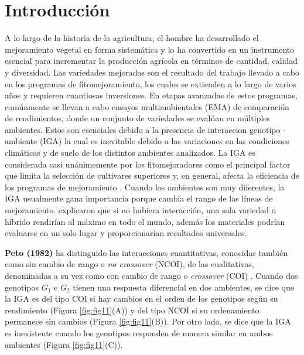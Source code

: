 

\chapter{Introducción}

A lo largo de la historia de la agricultura, el hombre ha desarrollado el mejoramiento vegetal en forma sistemática y lo ha convertido en un instrumento esencial para incrementar la producción agrícola en términos de cantidad, calidad y diversidad. Las variedades mejoradas son el resultado del trabajo llevado a cabo en los programas de fitomejoramiento, los cuales se extienden a lo largo de varios años y requieren cuantiosas inversiones. En etapas avanzadas de estos programas, comúnmente se llevan a cabo ensayos multiambientales (EMA) de comparación de rendimientos, donde un conjunto de variedades se evalúan en múltiples ambientes. Estos son esenciales debido a la presencia de interaccion genotipo - ambiente (IGA) la cual es inevitable debido a las variaciones en las condiciones climáticas y de suelo de los distintos ambientes analizados. La IGA es considerada casi unánimemente por los fitomejoradores como el principal factor que limita la selección de cultivares superiores y, en general, afecta la eficiencia de los programas de mejoramiento \citep{Crossaetal1990, CruzMedina1992, KangMagari1996}. Cuando los ambientes son muy diferentes, la IGA usualmente gana importancia porque cambia el rango de las líneas de mejoramiento. \citet{GauchZobel1997} explicaron que si no hubiera interacción, una sola variedad o híbrido rendirían al máximo en todo el mundo, además los materiales podrían evaluarse en un solo lugar y proporcionarían resultados universales.


\textbf{Peto (1982)} ha distinguido las interacciones cuantitativas, conocidas también como sin cambio de rango o \emph{no crossover} (NCOI), de las cualitativas, denominadas a su vez como con
cambio de rango o \emph{crossover} (COI) \citep{Corneliusetal1996}. Cuando dos genotipos $G_1$ e $G_2$ tienen una respuesta diferencial en dos ambientes, se dice que la IGA es del tipo COI si hay cambios en el orden de los genotipos según su rendimiento (Figura \ref{fig:fig11}(A)) y del tipo NCOI si su ordenamiento permanece sin cambios (Figura  \ref{fig:fig11}(B)). Por otro lado, se dice que la IGA es inexistente cuando los genotipos responden de manera similar en ambos ambientes (Figura \ref{fig:fig11}(C)). 


